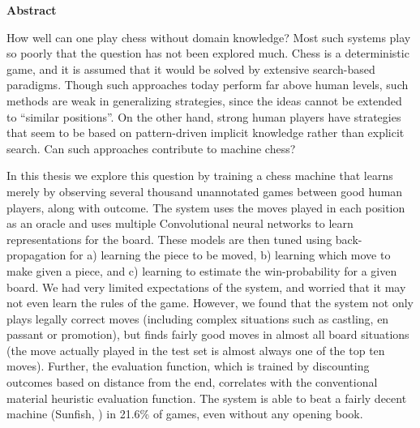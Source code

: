 \cleardoublepage

\begin{center}
	\huge{\textbf{Abstract}}
\end{center}

How well can one play chess without domain knowledge?  
Most such systems play so poorly that the question has not
been explored much.  Chess is a deterministic game, and it is assumed
that it would be solved by extensive search-based paradigms.  Though such 
approaches today perform far above human levels, such methods are weak in 
generalizing strategies, since the ideas cannot be extended to ``similar 
positions''. On the other hand, strong human players have strategies that seem 
to be based on pattern-driven implicit knowledge rather than explicit search.  
Can such approaches contribute to machine chess?

In this thesis we explore this question by training a chess machine that
learns merely by observing several thousand unannotated games between good
human players, along with outcome. The system uses the moves played in each
position as an oracle and uses multiple Convolutional neural networks to learn 
representations for the board.  These models are then tuned using 
back-propagation for a) learning the piece to be moved, b) learning which move 
to make given a piece, and c) learning to estimate the win-probability for a 
given board. We had very limited expectations of the system, and worried that 
it may not even learn the rules of the game. However, we found that the system 
not only plays legally correct moves (including complex situations such as 
castling, en passant or promotion), but finds fairly good moves in almost all 
board situations (the move actually played in the test set is almost always one 
of the top ten moves). Further, the evaluation function, which is trained by
discounting outcomes based on distance from the end, correlates with the 
conventional material heuristic evaluation function.  The system is able to
beat a fairly decent machine (Sunfish, \cite{sunfish}) in 21.6\% of games, even 
without any opening book.
